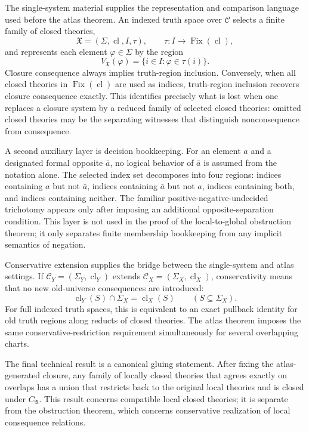 \documentclass[11pt]{amsart}
\numberwithin{equation}{section}
\theoremstyle{plain}
\theoremstyle{definition}
\theoremstyle{remark}
\newcommand{\Cl}{\operatorname{cl}}
\newcommand{\Fix}{\operatorname{Fix}}
\newcommand{\C}{\mathcal C}
\newcommand{\X}{\mathfrak X}
\newcommand{\A}{\mathfrak A}
\newcommand{\Sig}{\Sigma}
\begin{document}
The single-system material supplies the representation and comparison language used before the atlas theorem.  An indexed truth space over \(\C\) selects a finite family of closed theories,
\[
  \X=(\Sig,\Cl,I,\tau),
  \qquad \tau:I\to \Fix(\Cl),
\]
and represents each element \(\varphi\in\Sig\) by the region
\[
  V_{\X}(\varphi)=\{i\in I:\varphi\in\tau(i)\}.
\]
Closure consequence always implies truth-region inclusion.  Conversely, when all closed theories in \(\Fix(\Cl)\) are used as indices, truth-region inclusion recovers closure consequence exactly.  This identifies precisely what is lost when one replaces a closure system by a reduced family of selected closed theories: omitted closed theories may be the separating witnesses that distinguish nonconsequence from consequence.

A second auxiliary layer is decision bookkeeping.  For an element \(a\) and a designated formal opposite \(\bar a\), no logical behavior of \(\bar a\) is assumed from the notation alone.  The selected index set decomposes into four regions: indices containing \(a\) but not \(\bar a\), indices containing \(\bar a\) but not \(a\), indices containing both, and indices containing neither.  The familiar positive-negative-undecided trichotomy appears only after imposing an additional opposite-separation condition.  This layer is not used in the proof of the local-to-global obstruction theorem; it only separates finite membership bookkeeping from any implicit semantics of negation.

Conservative extension supplies the bridge between the single-system and atlas settings.  If \(\C_Y=(\Sig_Y,\Cl_Y)\) extends \(\C_X=(\Sig_X,\Cl_X)\), conservativity means that no new old-universe consequences are introduced:
\[
  \Cl_Y(S)\cap \Sig_X=\Cl_X(S)
  \qquad(S\subseteq\Sig_X).
\]
For full indexed truth spaces, this is equivalent to an exact pullback identity for old truth regions along reducts of closed theories.  The atlas theorem imposes the same conservative-restriction requirement simultaneously for several overlapping charts.

The final technical result is a canonical gluing statement.  After fixing the atlas-generated closure, any family of locally closed theories that agrees exactly on overlaps has a union that restricts back to the original local theories and is closed under \(C_{\A}\).  This result concerns compatible local closed theories; it is separate from the obstruction theorem, which concerns conservative realization of local consequence relations.
\end{document}
